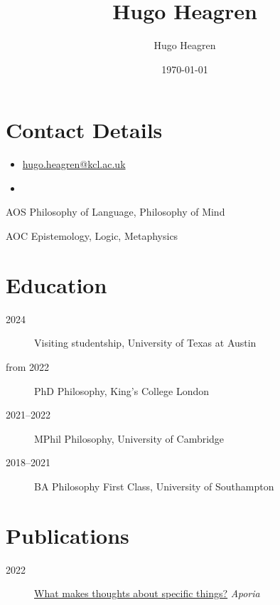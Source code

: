 \documentclass{cv}
\author{Hugo Heagren}
\date{\today}
\title{Hugo Heagren}
\begin{document}
\maketitle

\section*{Contact Details}
\label{sec:org45a0ec5}
\begin{itemize}
\item \href{mailto:hugo.heagren@kcl.ac.uk}{hugo.heagren@kcl.ac.uk}
\item {}
\end{itemize}

\begin{areas}
\item[{AOS}] Philosophy of Language, Philosophy of Mind
\item[{AOC}] Epistemology, Logic, Metaphysics
\end{areas}

\section*{Education}
\label{sec:orgb795769}
\begin{description}
\item[{2024}] Visiting studentship, University of Texas at Austin
\item[{from 2022}] PhD Philosophy, King's College London
\item[{2021--2022}] MPhil Philosophy, University of Cambridge
\item[{2018--2021}] BA Philosophy First Class, University of Southampton
\end{description}

\section*{Publications}
\label{sec:org057fae4}
\begin{description}
\item[{2022}] \href{https:\slash{}\slash{}ojs.st-andrews.ac.uk\slash{}index.php\slash{}aporia\slash{}article\slash{}view\slash{}2451}{What makes thoughts about specific things?} \emph{Aporia}
\end{description}
\end{document}
